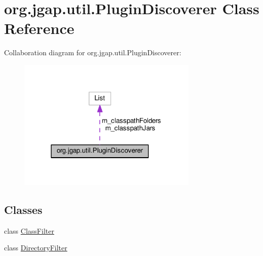 \hypertarget{classorg_1_1jgap_1_1util_1_1_plugin_discoverer}{\section{org.\-jgap.\-util.\-Plugin\-Discoverer Class Reference}
\label{classorg_1_1jgap_1_1util_1_1_plugin_discoverer}
}


Collaboration diagram for org.\-jgap.\-util.\-Plugin\-Discoverer\-:
\nopagebreak
\begin{figure}[H]
\begin{center}
\leavevmode
\includegraphics[width=243pt]{classorg_1_1jgap_1_1util_1_1_plugin_discoverer__coll__graph}
\end{center}
\end{figure}
\subsection*{Classes}
\begin{DoxyCompactItemize}
\item 
class \hyperlink{classorg_1_1jgap_1_1util_1_1_plugin_discoverer_1_1_class_filter}{Class\-Filter}
\item 
class \hyperlink{classorg_1_1jgap_1_1util_1_1_plugin_discoverer_1_1_directory_filter}{Directory\-Filter}
\end{DoxyCompactItemize}
